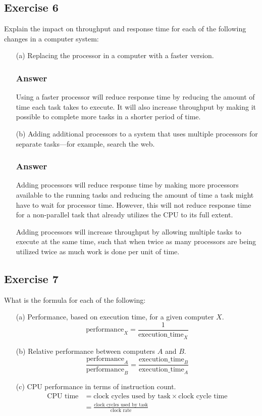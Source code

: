 \documentclass[12pt]{article}
\begin{document}
\subsection*{Exercise 6}
Explain the impact on throughput and response time for each of the following changes in a computer system:
\begin{itemize}
\item[(a)] Replacing the processor in a computer with a faster version.
\subsubsection*{Answer}
Using a faster processor will reduce response time by reducing the amount of time each task takes to execute. It will also increase throughput by making it possible to complete more tasks in a shorter period of time.
\item[(b)] Adding additional processors to a system that uses multiple processors for separate tasks---for example, search the web.
\subsubsection*{Answer}
Adding processors will reduce response time by making more processors available to the running tasks and reducing the amount of time a task might have to wait for processor time. However, this will not reduce response time for a non-parallel task that already utilizes the CPU to its full extent.

Adding processors will increase throughput by allowing multiple tasks to execute at the same time, such that when twice as many processors are being utilized twice as much work is done per unit of time.
\end{itemize}

\subsection*{Exercise 7}
What is the formula for each of the following:
\begin{itemize}
\item[(a)] Performance, based on execution time, for a given computer $X$.
\[\boxed{\text{performance}_X = \frac{1}{\text{execution\_time}_X}}\]
\item[(b)] Relative performance between computers $A$ and $B$.
\[
\frac{\text{performance}_A}{\text{performance}_B} = \frac{\text{execution\_time}_B}{\text{execution\_time}_A}
\]
\item[(c)] CPU performance in terms of instruction count.
\begin{align*}
\text{CPU time} &= \text{clock cycles used by task} \times \text{clock cycle time} \\
&= \frac{\text{clock cycles used by task}}{\text{clock rate}}
\end{align*}
\end{itemize}
\end{document}
